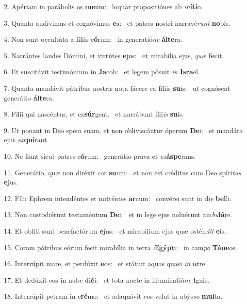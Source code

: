 2. Apériam in parábolis os \textbf{me}um: \ast\  loquar propositiónes ab \textit{in}\textbf{í}\textbf{ti}o.\

3. Quanta audívimus et cognóvimus \textbf{e}a: \ast\  et patres nostri narravé\textit{runt} \textbf{no}bis.\

4. Non sunt occultáta a fíliis e\textbf{ó}rum: \ast\  in generatió\textit{ne} \textbf{ál}\textbf{te}ra.\

5. Narrántes laudes Dómini, et virtútes \textbf{e}jus: \ast\  et mirabília ejus, \textit{quæ} \textbf{fe}cit.\

6. Et suscitávit testimónium in \textbf{Ja}cob: \ast\  et legem pósuit \textit{in} \textbf{Is}\textbf{ra}ël.\

7. Quanta mandávit pátribus nostris nota fácere ea fíliis \textbf{su}is: \ast\  ut cognóscat generáti\textit{o} \textbf{ál}\textbf{te}ra.\

8. Fílii qui nascéntur, et ex\textbf{súr}gent, \ast\  et narrábunt fíli\textit{is} \textbf{su}is.\

9. Ut ponant in Deo spem suam, et non obliviscántur óperum \textbf{De}i: \ast\  et mandáta ejus \textit{ex}\textbf{quí}rant.\

10. Ne fiant sicut patres e\textbf{ó}rum: \ast\  generátio prava et \textit{ex}\textbf{ás}\textbf{pe}rans.\

11. Generátio, quæ non diréxit cor \textbf{su}um: \ast\  et non est créditus cum Deo spíri\textit{tus} \textbf{e}jus.\

12. Fílii Ephrem intendéntes et mitténtes \textbf{ar}cum: \ast\  convérsi sunt in di\textit{e} \textbf{bel}li.\

13. Non custodiérunt testaméntum \textbf{De}i: \ast\  et in lege ejus noluérunt am\textit{bu}\textbf{lá}re.\

14. Et oblíti sunt benefactórum \textbf{e}jus: \ast\  et mirabílium ejus quæ ostén\textit{dit} \textbf{e}is.\

15. Coram pátribus eórum fecit mirabília in terra Æ\textbf{gýp}ti: \ast\  in cam\textit{po} \textbf{Tá}\textbf{ne}os.\

16. Interrúpit mare, et perdúxit \textbf{e}os: \ast\  et státuit aquas quasi \textit{in} \textbf{u}tre.\

17. Et dedúxit eos in nube di\textbf{é}i: \ast\  et tota nocte in illuminatió\textit{ne} \textbf{i}gnis.\

18. Interrúpit petram in e\textbf{ré}mo: \ast\  et adaquávit eos velut in abýs\textit{so} \textbf{mul}ta.\

